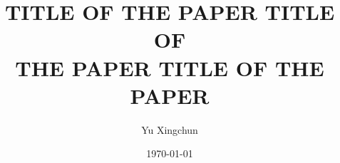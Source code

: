 \documentclass{article}
\begin{document}
\title{\uppercase{Title of the paper Title of \\ the paper Title of the paper}}

\author{
  Yu Xingchun
}

\date{\today}

\maketitle

\begin{abstract}

\end{abstract}




 
\cite{luNumericalStudyRiemann1998}


\end{document}

